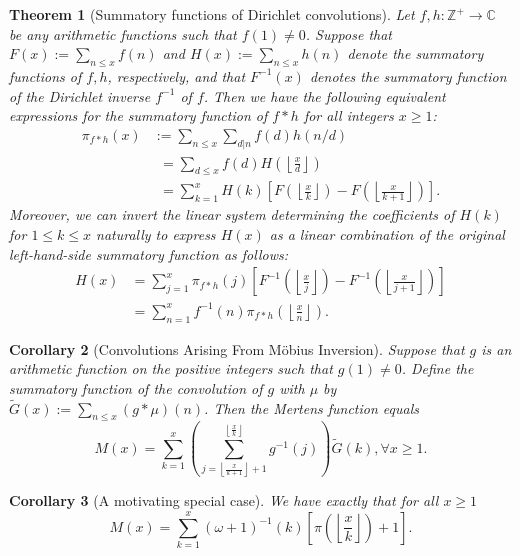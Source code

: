 \documentclass[11pt,reqno,a4letter]{article}
\numberwithin{figure}{section}
\numberwithin{table}{section}
\newcommand{\floor}[1]{\left\lfloor #1 \right\rfloor}
\newcommand{\Floor}[2]{\ensuremath{\left\lfloor \frac{#1}{#2} \right\rfloor}}
\theoremstyle{plain}
\newtheorem{theorem}{Theorem}
\newtheorem{cor}[theorem]{Corollary}
\numberwithin{theorem}{section}
\theoremstyle{definition}
\begin{document}
\begin{theorem}[Summatory functions of Dirichlet convolutions] 
\label{theorem_SummatoryFuncsOfDirCvls} 
Let $f,h: \mathbb{Z}^{+} \rightarrow \mathbb{C}$ be any arithmetic functions such that $f(1) \neq 0$. 
Suppose that $F(x) := \sum_{n \leq x} f(n)$ and $H(x) := \sum_{n \leq x} h(n)$ denote the summatory 
functions of $f,h$, respectively, and that $F^{-1}(x)$ denotes the summatory function of the 
Dirichlet inverse $f^{-1}$ of $f$. Then we have the following equivalent expressions for the 
summatory function of $f \ast h$ for all integers $x \geq 1$: 
\begin{align*} 
\pi_{f \ast h}(x) & := \sum_{n \leq x} \sum_{d|n} f(d) h(n/d) \\ 
     & \phantom{:}= \sum_{d \leq x} f(d) H\left(\Floor{x}{d}\right) \\ 
     & \phantom{:}= \sum_{k=1}^{x} H(k) \left[F\left(\Floor{x}{k}\right) - 
     F\left(\Floor{x}{k+1}\right)\right]. 
\end{align*} 
Moreover, we can invert the linear system determining the coefficients of $H(k)$ for $1 \leq k \leq x$ 
naturally to express $H(x)$ as a linear combination of the original left-hand-side 
summatory function as follows:
\begin{align*} 
H(x) & = \sum_{j=1}^{x} \pi_{f \ast h}(j) \left[F^{-1}\left(\Floor{x}{j}\right) - 
     F^{-1}\left(\Floor{x}{j+1}\right)\right] \\ 
     & = \sum_{n=1}^{x} f^{-1}(n) \pi_{f \ast h}\left(\Floor{x}{n}\right). 
\end{align*} 
\end{theorem} 

\begin{cor}[Convolutions Arising From M\"obius Inversion] 
\label{cor_CvlGAstMu} 
Suppose that $g$ is an arithmetic function on the positive integers such that 
$g(1) \neq 0$. Define the summatory function of 
the convolution of $g$ with $\mu$ by $\widetilde{G}(x) := \sum_{n \leq x} (g \ast \mu)(n)$. 
Then the Mertens function equals 
\[
M(x) = \sum_{k=1}^{x} \left(\sum_{j=\floor{\frac{x}{k+1}}+1}^{\floor{\frac{x}{k}}} g^{-1}(j)\right) 
     \widetilde{G}(k), \forall x \geq 1. 
\]
\end{cor} 

\begin{cor}[A motivating special case] 
\label{cor_Mx_gInvnPixk_formula} 
We have exactly that for all $x \geq 1$ 
\begin{equation} 
\label{eqn_Mx_gInvnPixk_formula} 
M(x) = \sum_{k=1}^{x} (\omega+1)^{-1}(k) \left[\pi\left(\Floor{x}{k}\right) + 1\right]. 
\end{equation} 
\end{cor} 
\end{document}
